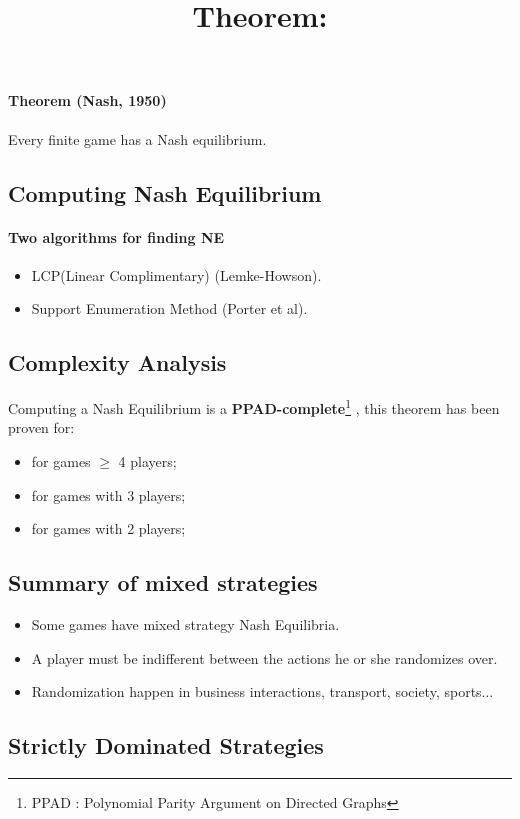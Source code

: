 \paragraph{Theorem (Nash, 1950)} Every finite game has a Nash equilibrium.

\subsection{Computing Nash Equilibrium}
\paragraph{Two algorithms for finding NE }
\begin{itemize}
\item LCP(Linear Complimentary) (Lemke-Howson).
\item Support Enumeration Method (Porter et al).
\end{itemize}

\subsection{Complexity Analysis}
\title{\textbf{Theorem:}}
Computing a Nash Equilibrium is a \textbf{PPAD-complete}\footnote{PPAD : Polynomial Parity Argument on Directed Graphs} , this theorem has been proven for:
\begin{itemize}
\item for games $\geq$ 4 players;
\item for games with 3 players;
\item for games with 2 players;
\end{itemize}

\subsection{Summary of mixed strategies}
\begin{itemize}
\item Some games have mixed strategy Nash Equilibria.
\item A player must be indifferent between the actions he or she randomizes over.
\item Randomization happen in business interactions, transport, society, sports...
\end{itemize}

\subsection{Strictly Dominated Strategies}
